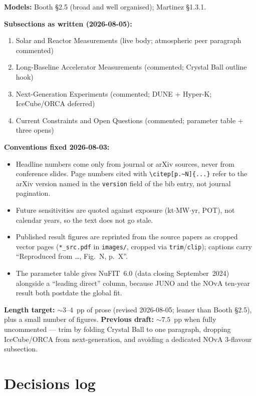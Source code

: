 \documentclass[11pt]{article}
\begin{document}
\textbf{Models:} Booth \S2.5 (broad and well organised); Martinez \S1.3.1.

\textbf{Subsections as written (2026-08-05):}
\begin{enumerate}
    \item Solar and Reactor Measurements (live body; atmospheric peer paragraph commented)
    \item Long-Baseline Accelerator Measurements (commented; Crystal Ball outline hook)
    \item Next-Generation Experiments (commented; DUNE + Hyper-K; IceCube/ORCA deferred)
    \item Current Constraints and Open Questions (commented; parameter table + three opens)
\end{enumerate}

\textbf{Conventions fixed 2026-08-03:}
\begin{itemize}
    \item Headline numbers come only from journal or arXiv sources, never from conference
    slides. Page numbers cited with \verb|\citep[p.~N]{...}| refer to the arXiv version
    named in the \texttt{version} field of the bib entry, not journal pagination.
    \item Future sensitivities are quoted against exposure (kt$\cdot$MW$\cdot$yr, POT),
    not calendar years, so the text does not go stale.
    \item Published result figures are reprinted from the source papers as cropped vector
    pages (\texttt{*\_src.pdf} in \texttt{images/}, cropped via \texttt{trim}/\texttt{clip});
    captions carry ``Reproduced from \dots, Fig.~N, p.~X''.
    \item The parameter table gives NuFIT~6.0 (data closing September~2024) alongside a
    ``leading direct'' column, because JUNO and the NOvA ten-year result both postdate
    the global fit.
\end{itemize}

\textbf{Length target:} $\sim 3$--$4$~pp of prose (revised 2026-08-05; leaner than Booth
\S2.5), plus a small number of figures.
\textbf{Previous draft:} $\sim 7.5$~pp when fully uncommented --- trim by folding Crystal Ball
to one paragraph, dropping IceCube/ORCA from next-generation, and avoiding a dedicated
NOvA 3-flavour subsection.
\section{Decisions log}
\end{document}
